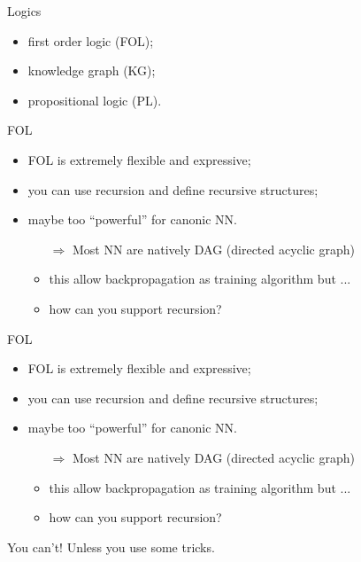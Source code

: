 \documentclass[presentation]{beamer}\mode<presentation>{\usetheme{AMSBolognaFC}}
\begin{document}
\begin{frame}[c]{Logics}
    \begin{itemize}
        \item first order logic (FOL);
        \item knowledge graph (KG);
        \item propositional logic (PL).
        
    \end{itemize}
\end{frame}

\begin{frame}[c]{FOL}
    \begin{itemize}
        \item FOL is extremely flexible and expressive;
        \item you can use recursion and define recursive structures;
        \item maybe too ``powerful'' for canonic NN.
        \begin{itemize}
            \item[$\Rightarrow$] Most NN are natively DAG (directed acyclic graph)
            \item this allow backpropagation as training algorithm but ...
            \item how can you support recursion?  
        \end{itemize}
    \end{itemize}
    \centering\vfill
    \phantom{You can't!}
    \phantom{Unless you use some tricks.}
\end{frame}

\begin{frame}[c]{FOL}
    \begin{itemize}
        \item FOL is extremely flexible and expressive;
        \item you can use recursion and define recursive structures;
        \item maybe too ``powerful'' for canonic NN.
        \begin{itemize}
            \item[$\Rightarrow$] Most NN are natively DAG (directed acyclic graph)
            \item this allow backpropagation as training algorithm but ...
            \item how can you support recursion?  
        \end{itemize}
    \end{itemize}
    \centering\vfill
    You can't!
    Unless you use some tricks.
\end{frame}
\end{document}
